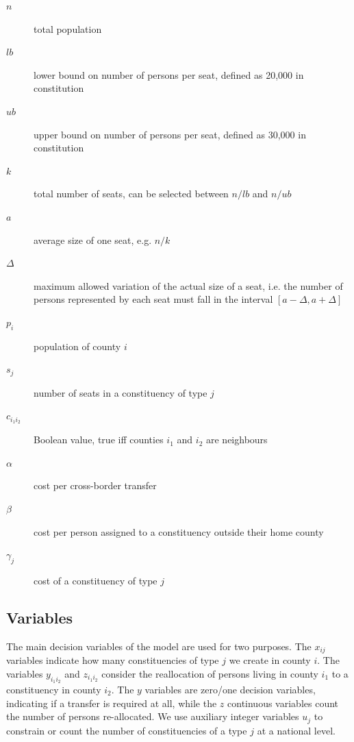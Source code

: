 \documentclass[runningheads]{llncs}
\begin{document}
\begin{description}
\item[$n$] total population
\item[$lb$] lower bound on number of persons per seat, defined as 20,000 in constitution
\item[$ub$] upper bound on number of persons per seat, defined as 30,000 in constitution
\item[$k$] total number of seats, can be selected between $n/lb$ and $n/ub$ 
\item[$a$] average size of one seat, e.g. $n/k$
\item[$\Delta$] maximum allowed variation of the actual size of a seat, i.e. the number of persons represented by each seat must fall in the interval $[a-\Delta,a+\Delta]$ 
\item[$p_{i}$] population of county $i$
\item[$s_{j}$] number of seats in a constituency of type $j$
\item[$c_{i_1i_2}$] Boolean value, true iff counties $i_1$ and $i_2$ are neighbours 
\item[$\alpha$] cost per cross-border transfer
\item[$\beta$] cost per person assigned to a constituency outside their home county
\item[$\gamma_{j}$] cost of a constituency of type $j$
\end{description}

\subsection{Variables}

The main decision variables of the model are used for two purposes. The $x_{ij}$ variables indicate how many constituencies of type $j$ we create in county $i$. The variables $y_{i_1i_2}$ and $z_{i_1i_2}$ consider the reallocation of persons living in county $i_1$ to a constituency in county $i_2$. The $y$ variables are zero/one decision variables, indicating if a transfer is required at all, while the $z$ continuous variables count the number of persons re-allocated. We use auxiliary integer variables $u_{j}$ to constrain or count the number of constituencies of a type $j$ at a national level. 
\end{document}
